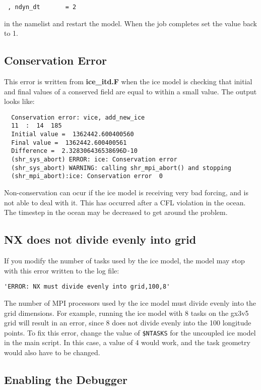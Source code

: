 \begin{verbatim}
 , ndyn_dt       = 2
\end{verbatim}

in the namelist and restart the model.  When the job completes set the value
back to 1.

\subsection{Conservation Error}

This error is written from {\bf ice\_itd.F} when the ice model is checking
that initial and final values of a conserved field are equal to within
a small value. The output looks like:

\begin{verbatim}
  Conservation error: vice, add_new_ice
  11  :  14  185
  Initial value =  1362442.600400560
  Final value =  1362442.600400561
  Difference =  2.328306436538696D-10
  (shr_sys_abort) ERROR: ice: Conservation error
  (shr_sys_abort) WARNING: calling shr_mpi_abort() and stopping
  (shr_mpi_abort):ice: Conservation error  0
\end{verbatim}

Non-conservation can ocur if the ice model is receiving
very bad forcing, and is not able to deal with it.  This has occurred
after a CFL violation in the ocean.  The timestep in the ocean may
be decreased to get around the problem.

\subsection{NX does not divide evenly into grid}

If you modify the number of tasks used by the ice model, the model may stop
with this error written to the log file:
\begin{verbatim}
'ERROR: NX must divide evenly into grid,100,8'
\end{verbatim}

The number of MPI processors used by the ice model must divide evenly into the grid
dimensions.  For example, running the ice model with 8 tasks on the gx3v5
grid will result in an error, since 8 does not divide evenly into the
100 longitude points.  To fix this error, change the value of {\tt \$NTASKS} for the
uncoupled ice model in the main script.  In this case, a value of 4 would work, and
the task geometry would also have to be changed.

\subsection{Enabling the Debugger}

